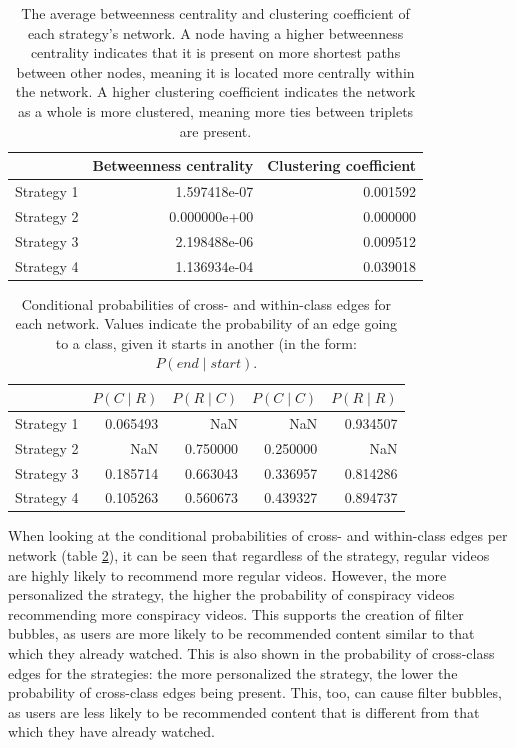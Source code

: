\documentclass[../main.tex]{subfiles}
\begin{document}
\begin{table}[b]
\centering
\begin{tabular}{lrr}
\toprule
{} &  Betweenness centrality &  Clustering coefficient \\
\midrule
Strategy 1 &            1.597418e-07 &                0.001592 \\
Strategy 2 &            0.000000e+00 &                0.000000 \\
Strategy 3 &            2.198488e-06 &                0.009512 \\
Strategy 4 &            1.136934e-04 &                0.039018 \\
\bottomrule
\end{tabular}
\caption{\label{tab:net_metrics} The average betweenness centrality and clustering coefficient of each strategy's network. A node having a higher betweenness centrality indicates that it is present on more shortest paths between other nodes, meaning it is located more centrally within the network. A higher clustering coefficient indicates the network as a whole is more clustered, meaning more ties between triplets are present.}
\end{table}

\begin{table}
\centering
\begin{tabular}{lrrrr}
\toprule
{} &    $P(C \mid R)$  & $P(R \mid C)$ &    $P(C \mid C)$ &  $P(R \mid R)$ \\
\midrule
Strategy 1 &  0.065493 &       NaN &       NaN &  0.934507 \\
Strategy 2 &       NaN &  0.750000 &  0.250000 &       NaN \\
Strategy 3 &  0.185714 &  0.663043 &  0.336957 &  0.814286 \\
Strategy 4 &  0.105263 &  0.560673 &  0.439327 &  0.894737 \\
\bottomrule
\end{tabular}
\caption{\label{tab:cond-probs} Conditional probabilities of cross- and within-class edges for each network. Values indicate the probability of an edge going to a class, given it starts in another (in the form: $P(end \mid start)$.}
\end{table}

When looking at the conditional probabilities of cross- and within-class edges per network (table 
\ref{tab:cond-probs}), it can be seen that regardless of the strategy, regular videos are highly likely to 
recommend more regular videos. However, the more personalized the strategy, the higher the probability of 
conspiracy videos recommending more conspiracy videos. This supports the creation of filter bubbles, as 
users are more likely to be recommended content similar to that which they already watched. This is also 
shown in the probability of cross-class edges for the strategies: the more personalized the strategy, the 
lower the probability of cross-class edges being present. This, too, can cause filter bubbles, as users are 
less likely to be recommended content that is different from that which they have already watched. 
\end{document}
